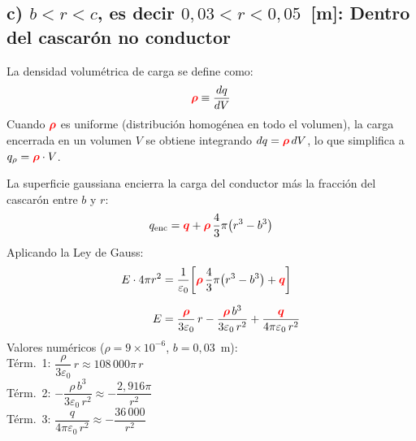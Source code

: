 \documentclass[12pt,letterpaper]{article}
\newcommand{\qr}{{\color{red}\bm{q}}}
\newcommand{\rhor}{{\color{red}\bm{\rho}}}
\begin{document}
\bigskip

\subsection*{c) $b < r < c$, es decir $0{,}03 < r < 0{,}05$~[m]: Dentro del cascar\'on no conductor}

La densidad volum\'etrica de carga se define como:
\[
    \rhor \equiv \frac{dq}{dV}
\]
Cuando $\rhor$ es uniforme (distribuci\'on homog\'enea en todo el volumen), la carga encerrada
en un volumen $V$ se obtiene integrando $dq = \rhor\,dV$, lo que simplifica a
$q_\rho = \rhor \cdot V$.

\noindent
\begin{minipage}[c]{0.30\textwidth}
\centering
{}
\end{minipage}%
\hfill
\begin{minipage}[c]{0.67\textwidth}
La superficie gaussiana encierra la carga del conductor m\'as la fracci\'on
del cascar\'on entre $b$ y $r$:
\[
    q_\text{enc} = \qr + \rhor\,\frac{4}{3}\pi\bigl(r^3 - b^3\bigr)
\]
Aplicando la Ley de Gauss:
\begin{align*}
    E \cdot 4\pi r^2
        &= \frac{1}{\varepsilon_0}\!\left[\rhor\,\frac{4}{3}\pi\bigl(r^3 - b^3\bigr) + \qr\right] \\[6pt]
    E   &= \frac{\rhor}{3\varepsilon_0}\,r
           - \frac{\rhor\,b^3}{3\varepsilon_0\,r^2}
           + \frac{\qr}{4\pi\varepsilon_0\,r^2}
\end{align*}
Valores num\'ericos ($\rho = 9\!\times\!10^{-6}$, $b = 0{,}03$~m):\\[4pt]
T\'erm.~1: $\dfrac{\rho}{3\varepsilon_0}\,r
    \approx 108\,000\pi\,r$\\[4pt]
T\'erm.~2: $-\dfrac{\rho\,b^3}{3\varepsilon_0\,r^2}
    \approx -\dfrac{2{,}916\pi}{r^2}$\\[4pt]
T\'erm.~3: $\dfrac{q}{4\pi\varepsilon_0\,r^2}
    \approx -\dfrac{36\,000}{r^2}$
\end{minipage}
\end{document}
